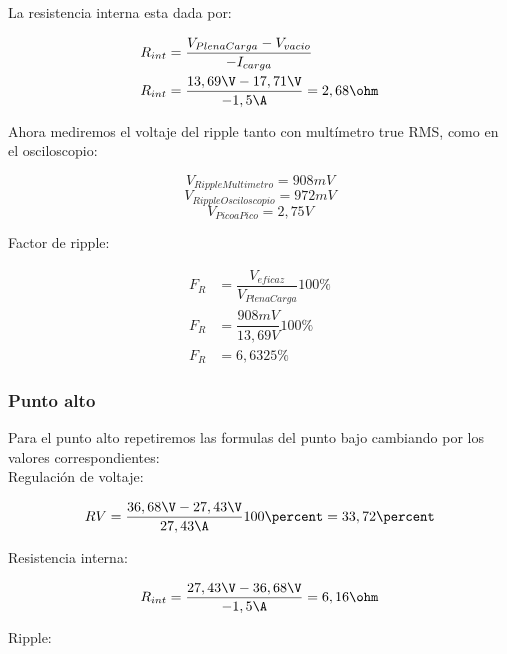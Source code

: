 La resistencia interna esta dada por:

\begin{equation}
  \begin{aligned}
    R_{int} &= \dfrac{V_{PlenaCarga} - V_{vacio}}{-I_{carga}}\\
    R_{int} &= \dfrac{13,69\V - 17,71\V}{-1,5\A} = 2,68\ohm
  \end{aligned}
\end{equation}

Ahora mediremos el voltaje del ripple tanto con multímetro true RMS, como en el osciloscopio:

\begin{equation}
  V_{RippleMultimetro} = 908 mV
\end{equation}
\begin{equation}
  V_{RippleOsciloscopio} = 972 mV
\end{equation}
\begin{equation}
  V_{PicoaPico} = 2,75 V
\end{equation}

Factor de ripple:

\begin{equation}
  \begin{aligned}
    F_R &= \dfrac{V_{eficaz}}{V_{PlenaCarga}} 100\percent\\
    F_R &= \dfrac{908 mV}{13,69 V} 100\percent\\
    F_R &= 6,6325\percent
  \end{aligned}
\end{equation}

\subsubsection{Punto alto}
Para el punto alto repetiremos las formulas del punto bajo cambiando por los valores correspondientes: \\

Regulación de voltaje:

\begin{equation}
  RV = \dfrac{36,68\V - 27,43\V}{27,43\A} 100\percent = 33,72\percent
\end{equation}

Resistencia interna:

\begin{equation}
  R_{int} = \dfrac{27,43\V - 36,68\V}{-1,5\A} = 6,16\ohm
\end{equation}

Ripple:

